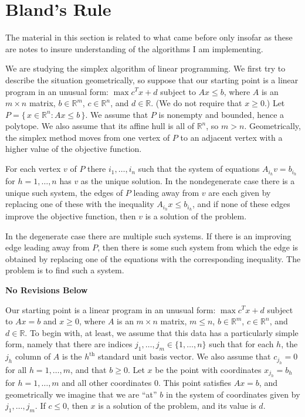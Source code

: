 \documentclass[12pt, A4paper]{article}
\theoremstyle{definition}
\newcommand{\norev}{\medskip \centerline{\textbf{No Revisions Below}} \medskip}
\renewcommand{\Re}{\mathbb{R}}
\begin{document}
\section{Bland's Rule}

The material in this section is related to what came before only insofar as these are notes to insure understanding of the algorithms I am implementing.  

We are studying the simplex algorithm of linear programming.  We first try to describe the situation geometrically, so suppose that our starting point is a linear program in an unusual form: $\max c^Tx + d$ subject to $Ax \le b$, where $A$ is an $m \times n$ matrix, $b \in \Re^m$, $c \in \Re^n$, and $d \in \Re$.   (We do not require that $x \ge 0$.) Let $P = \{\, x \in \Re^n : Ax \le b \,\}$.  We assume that $P$ is nonempty and bounded, hence a polytope.  We also assume that its affine hull is all of $\Re^n$, so $m > n$.  Geometrically, the simplex method moves from one vertex of $P$ to an adjacent vertex with a higher value of the objective function.  

For each vertex $v$ of $P$ there $i_1, \ldots, i_n$ such that the system of equations $A_{i_h} v = b_{i_h}$ for $h = 1, \ldots, n$ has $v$ 
as the unique solution.  In the nondegenerate case there is a unique such system, the edges of $P$ leading away from $v$ are each given by replacing one of these with 
the inequality $A_{i_h} x \le b_{i_h}$, and if none of these edges improve the objective function, then $v$ is a solution of the problem.  

In the degenerate case there are multiple such systems.  If there is an improving edge leading away from $P$, then there is some such system from which the edge is obtained by replacing one of the equations with the corresponding inequality.  The problem is to find such a system.

\norev


Our starting point is a linear program in an unusual form: $\max c^Tx + d$ subject to $Ax = b$ and $x \ge 0$, where $A$ is an $m \times n$ matrix, $m \le n$, $b \in \Re^m$, $c \in \Re^n$, and $d \in \Re$.  To begin with, at least, we assume that this data has a particularly simple form, namely that there are indices $j_1, \ldots, j_m \in \{1, \ldots, n\}$ such that for each $h$, the $j_h$ column of $A$ is the $h^{\text{th}}$ standard unit basis vector.  We also assume that $c_{j_h} = 0$ for all $h = 1, \ldots, m$, and that $b \ge 0$.   Let $x$ be the point with coordinates $x_{j_h} = b_h$ for $h = 1, \ldots, m$ and all other coordinates $0$.  This point satisfies $Ax = b$, and geometrically we imagine that we are ``at'' $b$ in the system of coordinates given by $j_1, \ldots, j_m$.
If $c \le 0$, then $x$ is a solution of the problem, and its value is $d$.
\end{document}
